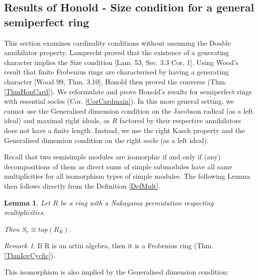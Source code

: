 \documentclass[11pt]{article}
\theoremstyle{plain}
\newtheorem{Lemma}[veta]{Lemma}
\theoremstyle{remark}
\newtheorem*{remark}{Remark}
\theoremstyle{plain}
\begin{document}
\subsection{Results of Honold - Size condition for a general semiperfect ring } \label{SecCardHon}


This section examines cardinality conditions without assuming the Double annihilator property. Lamprecht proved that the existence of a generating character implies the Size condition [Lam. 53, Sec. 3.3 Cor. 1]. Using Wood's result that finite Frobenius rings are characterised by having a generating character [Wood 99, Thm. 3.10],  Honold then proved the converse (Thm. \ref{ThmHonCard}). We reformulate and prove Honold's results for semiperfect rings with essential socles (Cor. \ref{CorCardmain}). In this more general setting, we cannot use the Generalised dimension condition on the Jacobson radical (as a left ideal) and maximal right ideals, as $R$ factored by their respective annihilators does not have a finite length. Instead, we use the right Kasch property and the Generalised dimension condition on the right socle (as a left ideal).


\smallskip

Recall that two semisimple modules are isomorphic if and only if (any) decompositions of them as direct sums of simple submodules have all same multiplicities for all isomorphism types of simple modules. The following Lemma then follows directly from the Definition \ref{DefMult}.
\begin{Lemma}\label{LemmaNakMult}
    Let $R$ be a ring with a Nakayama permutation respecting multiplicities. 

    Then $S_r\cong top(R_R)$.
\end{Lemma}
\begin{remark}
    If R is an artin algebra, then it is a Frobenius ring (Thm. \ref{ThmIovCyclic}).
\end{remark}

This isomorphism is also implied by the Generalised dimension condition:
\end{document}
